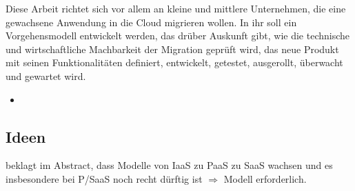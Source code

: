 Diese Arbeit richtet sich vor allem an kleine und mittlere Unternehmen, die 
eine gewachsene Anwendung in die Cloud migrieren wollen. In ihr soll ein 
Vorgehensmodell entwickelt werden, das drüber Auskunft gibt, wie die technische 
und wirtschaftliche Machbarkeit der Migration geprüft wird, das neue Produkt 
mit seinen Funktionalitäten definiert, entwickelt, getestet, ausgerollt, 
überwacht und gewartet wird.
\begin{itemize}
	\item 
\end{itemize}


\subsection{Ideen}
 beklagt im Abstract, dass Modelle von 
IaaS zu PaaS zu SaaS wachsen und es insbesondere bei P/SaaS noch recht dürftig 
ist $\Rightarrow$ Modell erforderlich.

